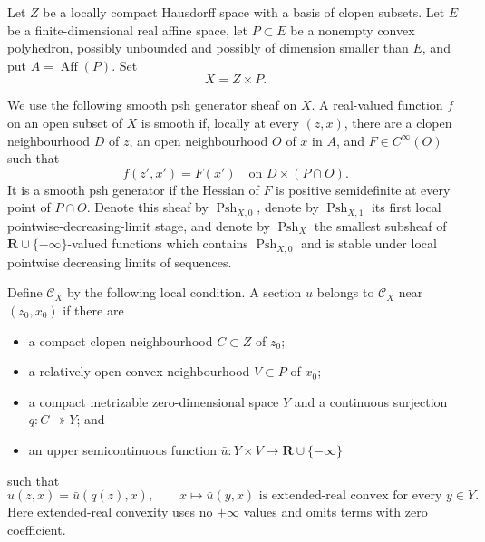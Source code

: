 
Let \(Z\) be a locally compact Hausdorff space with a basis of clopen
subsets.  Let \(E\) be a finite-dimensional real affine space, let
\(P\subset E\) be a nonempty convex polyhedron, possibly unbounded and
possibly of dimension smaller than \(E\), and put
\(A=\operatorname{Aff}(P)\).  Set
\[
                              X=Z\times P .
\]

We use the following smooth psh generator sheaf on \(X\).  A real-valued
function \(f\) on an open subset of \(X\) is smooth if, locally at every
\((z,x)\), there are a clopen neighbourhood \(D\) of \(z\), an open
neighbourhood \(O\) of \(x\) in \(A\), and \(F\in C^\infty(O)\) such that
\[
                  f(z',x')=F(x')
       \quad\text{on }D\times(P\cap O).
\]
It is a smooth psh generator if the Hessian of \(F\) is positive
semidefinite at every point of \(P\cap O\).  Denote this sheaf by
\(\operatorname{Psh}_{X,0}\), denote by
\(\operatorname{Psh}_{X,1}\) its first local pointwise-decreasing-limit
stage, and denote by \(\operatorname{Psh}_X\) the smallest subsheaf of
\(\mathbf R\cup\{-\infty\}\)-valued functions which contains
\(\operatorname{Psh}_{X,0}\) and is stable under local pointwise decreasing
limits of sequences.

Define \(\mathscr C_X\) by the following local condition.  A section \(u\)
belongs to \(\mathscr C_X\) near \((z_0,x_0)\) if there are
\begin{itemize}
\item a compact clopen neighbourhood \(C\subset Z\) of \(z_0\);
\item a relatively open convex neighbourhood \(V\subset P\) of \(x_0\);
\item a compact metrizable zero-dimensional space \(Y\) and a continuous
  surjection \(q:C\twoheadrightarrow Y\); and
\item an upper semicontinuous function
  \(\bar u:Y\times V\to\mathbf R\cup\{-\infty\}\)
\end{itemize}
such that
\begin{equation}
 u(z,x)=\bar u(q(z),x),
 \qquad
 x\longmapsto\bar u(y,x)\text{ is extended-real convex for every }y\in Y.
 \label{eq:p071-polyhedral-factorization}
\end{equation}
Here extended-real convexity uses no \(+\infty\) values and omits terms
with zero coefficient.


